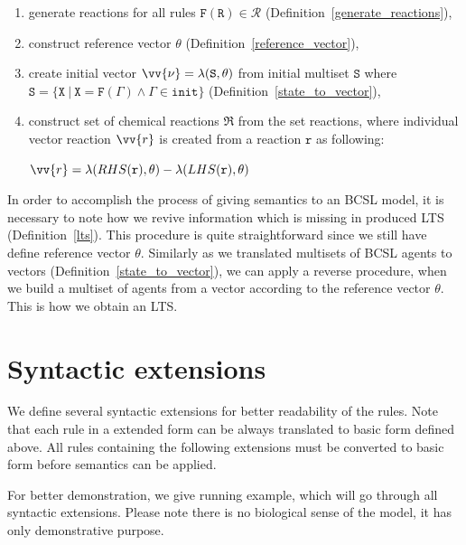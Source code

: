 \documentclass[12pt]{fithesis2}
\begin{document}
\begin{enumerate}
\item generate reactions for all rules $\mathtt{F}(\mathtt{R}) \in \mathcal{R}$ (Definition~\ref{generate_reactions}),
\item construct reference vector $\theta$ (Definition~\ref{reference_vector}),
\item create initial vector $\vv{\nu} = \lambda(\mathtt{S}, \theta)$ from initial multiset $\mathtt{S}$ where $\mathtt{S} = \{ \mathtt{X} ~|~ \mathtt{X} = \mathtt{F}(\Gamma) \wedge \Gamma \in \mathtt{init} \}$ (Definition~\ref{state_to_vector}),
\item construct set of chemical reactions $\mathfrak{R}$ from the set reactions, where individual vector reaction $\vv{r}$ is created from a reaction $\mathtt{r}$ as following:

\begin{center}
$\vv{r} = \lambda(RHS(\mathtt{r}), \theta) - \lambda(LHS(\mathtt{r}), \theta)$
\end{center}

\end{enumerate}

In order to accomplish the process of giving semantics to an BCSL model, it is necessary to note how we revive information which is missing in produced LTS (Definition~\ref{lts}). This procedure is quite straightforward since we still have define reference vector $\theta$. Similarly as we translated multisets of BCSL agents to vectors (Definition~\ref{state_to_vector}), we can apply a reverse procedure, when we build a multiset of agents from a vector according to the reference vector $\theta$. This is how we obtain an LTS.  

\section{Syntactic extensions}
\label{syntactic_extensions}

We define several syntactic extensions for better readability of the rules. Note that each rule in a extended form can be always translated to basic form defined above. All rules containing the following extensions must be converted to basic form before semantics can be applied.

For better demonstration, we give running example, which will go through all syntactic extensions. Please note there is no biological sense of the model, it has only demonstrative purpose.
\end{document}
